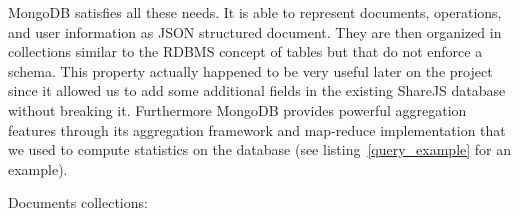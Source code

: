 \documentclass{llncs}
\begin{document}
MongoDB satisfies all these needs. It is able to represent documents, operations,
and user information as JSON structured document. They are then organized in
collections similar to the RDBMS concept of tables but that do not enforce a schema.
This property actually happened to be very useful later on the project since it
allowed us to add some additional fields in the existing ShareJS database without
breaking it. Furthermore MongoDB provides powerful aggregation features through
its aggregation framework and map-reduce implementation that we used to compute
statistics on the database (see listing~\ref{query_example} for an example).


Documents collections:
%
\end{document}
